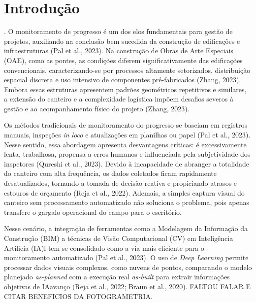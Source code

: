 
\chapter{Introdução}
\label{chap:intro}.
O monitoramento de progresso é um dos elos fundamentais para gestão de projetos, auxiliando na conclusão bem sucedida da construção de edificações e infraestruturas (Pal et al., 2023). Na construção de Obras de Arte Especiais (OAE), como as pontes, as condições diferem significativamente das edificações convencionais, caracterizando-se por processos altamente setorizados, distribuição espacial discreta e uso intensivo de componentes pré-fabricados (Zhang, 2023). Embora essas estruturas apresentem padrões geométricos repetitivos e similares, a extensão do canteiro e a complexidade logística impõem desafios severos à gestão e ao acompanhamento físico do projeto (Zhang, 2023).

Os métodos tradicionais de monitoramento do progresso se baseiam em registros manuais, inspeções \textit{in loco} e atualizações em planilhas ou papel (Pal et al., 2023). Nesse sentido, essa abordagem apresenta desvantagens críticas: é excessivamente lenta, trabalhosa, propensa a erros humanos e influenciada pela subjetividade dos inspetores (Qureshi et al., 2023). Devido à incapacidade de abranger a totalidade do canteiro com alta frequência, os dados coletados ficam rapidamente desatualizados, tornando a tomada de decisão reativa e propiciando atrasos e estouros de orçamento (Reja et al., 2022). Ademais, a simples captura visual do canteiro sem processamento automatizado não soluciona o problema, pois apenas transfere o gargalo operacional do campo para o escritório.  



 Nesse cenário, a integração de ferramentas como a Modelagem da Informação da Construção (BIM) a técnicas de Visão Computacional (CV) em Inteligência Artificia (IA)l tem se consolidado como a via mais eficiente para o monitoramento automatizado (Pal et al., 2023). O uso de \textit{Deep Learning} permite processar dados visuais complexos, como nuvens de pontos, comparando o modelo planejado \textit{as-planned} com a execução real \textit{as-built} para extrair informações objetivas de IAavanço (Reja et al., 2022; Braun et al., 2020).  
 FALTOU FALAR E CITAR BENEFICIOS DA FOTOGRAMETRIA.
 
